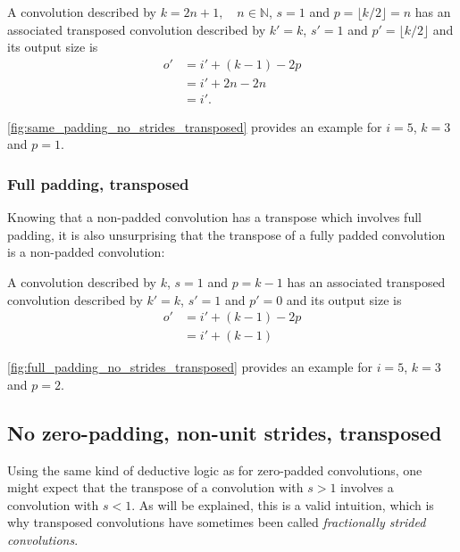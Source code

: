 \documentclass{article}
\begin{document}
\begin{prop}\label{prop:half_padding_no_strides_transposed}
A convolution described by $k = 2n + 1, \quad n \in \mathbb{N}$, $s = 1$ and $p
= \lfloor k / 2 \rfloor = n$ has an associated transposed convolution described
by $k' = k$, $s' = 1$ and $p' = \lfloor k / 2 \rfloor$ and its output size is
\begin{equation*}
\begin{split}
    o' &= i' + (k - 1) - 2p \\
       &= i' + 2n - 2n \\
       &= i'.
\end{split}
\end{equation*}
\end{prop}

\autoref{fig:same_padding_no_strides_transposed} provides an example for $i =
5$, $k = 3$ and $p = 1$.

\subsubsection{Full padding, transposed}

Knowing that a non-padded convolution has a transpose which involves full
padding, it is also unsurprising that the transpose of a fully padded
convolution is a non-padded convolution:

\begin{prop}\label{prop:full_padding_no_strides_transposed}
A convolution described by $k$, $s = 1$ and $p = k - 1$ has an associated
transposed convolution described by $k' = k$, $s' = 1$ and $p' = 0$ and its
output size is
\begin{equation*}
\begin{split}
    o' &= i' + (k - 1) - 2p \\
       &= i' + (k - 1)
\end{split}
\end{equation*}
\end{prop}

\autoref{fig:full_padding_no_strides_transposed} provides an example for $i =
5$, $k = 3$ and $p = 2$.

\subsection{No zero-padding, non-unit strides, transposed}

Using the same kind of deductive logic as for zero-padded convolutions, one
might expect that the transpose of a convolution with $s > 1$ involves a
convolution with $s < 1$. As will be explained, this is a valid intuition, which
is why transposed convolutions have sometimes been called {\em fractionally
strided convolutions}.
\end{document}
